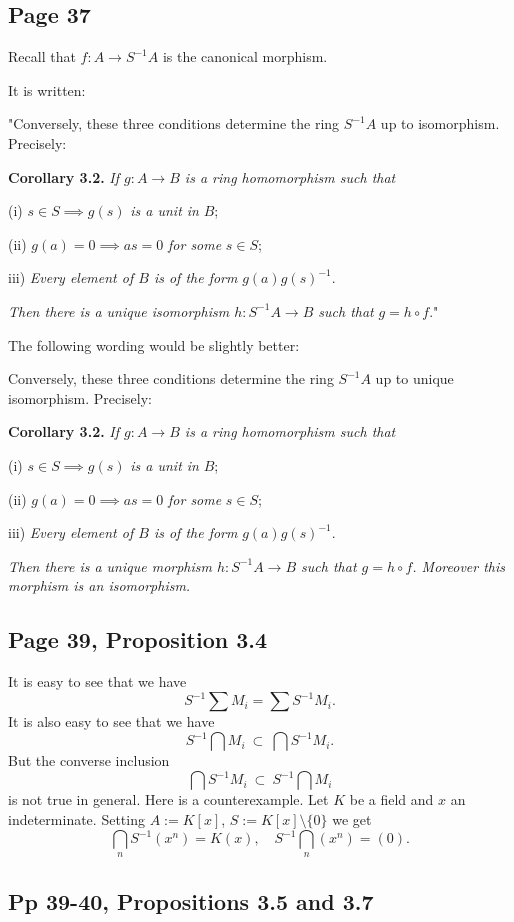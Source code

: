 \documentclass[parskip=half,fontsize=12pt]{scrartcl}%
\begin{document}
\subsection{Page 37}%

Recall that $f:A\to S^{-1}A$ is the canonical morphism.

It is written:

"Conversely, these three conditions determine the ring $S^{-1}A$ up to isomorphism. Precisely:

\textbf{Corollary 3.2.} \emph{If $g:A\to B$ is a ring homomorphism such that}

(i) $s\in S\implies g(s)$ \emph{is a unit in} $B$;

(ii) $g(a)=0\implies as=0$ \emph{for some} $s\in S$;

iii) \emph{Every element of $B$ is of the form} $g(a)g(s)^{-1}$.

\emph{Then there is a unique isomorphism $h:S^{-1}A\to B$ such that} $g=h\circ f$."

The following wording would be slightly better:

Conversely, these three conditions determine the ring $S^{-1}A$ up to unique isomorphism. Precisely:

\textbf{Corollary 3.2.} \emph{If $g:A\to B$ is a ring homomorphism such that}

(i) $s\in S\implies g(s)$ \emph{is a unit in} $B$;

(ii) $g(a)=0\implies as=0$ \emph{for some} $s\in S$;

iii) \emph{Every element of $B$ is of the form} $g(a)g(s)^{-1}$.

\emph{Then there is a unique morphism $h:S^{-1}A\to B$ such that $g=h\circ f$. Moreover this morphism is an isomorphism.}

\subsection{Page 39, Proposition 3.4}%

It is easy to see that we have 
$$
S^{-1}\sum M_i=\sum S^{-1}M_i.
$$ 
It is also easy to see that we have 
$$
S^{-1}\bigcap M_i\ \subset\ \bigcap S^{-1}M_i.
$$ 
But the converse inclusion 
$$
\bigcap S^{-1}M_i\ \subset\ S^{-1}\bigcap M_i
$$ 
is not true in general. Here is a counterexample. Let $K$ be a field and $x$ an indeterminate. Setting $A:=K[x]$, $S:=K[x]\setminus\{0\}$ we get 
$$
\bigcap_n S^{-1}(x^n)=K(x),\quad S^{-1}\bigcap_n(x^n)=(0).
$$

\subsection{Pp 39-40, Propositions 3.5 and 3.7}%
\end{document}
